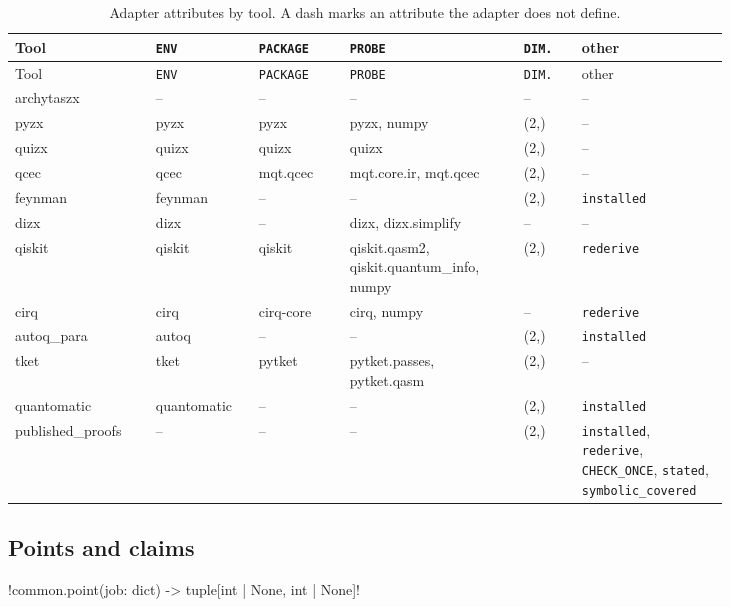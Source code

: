 \begin{longtable}{@{}>{\raggedright\arraybackslash}p{0.17\linewidth}>{\raggedright\arraybackslash}p{0.11\linewidth}>{\raggedright\arraybackslash}p{0.11\linewidth}>{\raggedright\arraybackslash}p{0.21\linewidth}>{\raggedright\arraybackslash}p{0.07\linewidth}>{\raggedright\arraybackslash}p{0.16\linewidth}@{}}
\caption{Adapter attributes by tool. A dash marks an attribute the adapter does not define.}\label{tab:bench-tools-attrs}\\
\toprule
Tool & \texttt{ENV} & \texttt{PACKAGE} & \texttt{PROBE} & \texttt{DIM.} & other \\
\midrule
\endfirsthead
\toprule
Tool & \texttt{ENV} & \texttt{PACKAGE} & \texttt{PROBE} & \texttt{DIM.} & other \\
\midrule
\endhead
\bottomrule
\endfoot
archytaszx & -- & -- & -- & -- & -- \\
pyzx & pyzx & pyzx & pyzx, numpy & (2,) & -- \\
quizx & quizx & quizx & quizx & (2,) & -- \\
qcec & qcec & mqt.qcec & mqt.core.ir, mqt.qcec & (2,) & -- \\
feynman & feynman & -- & -- & (2,) & \texttt{installed} \\
dizx & dizx & -- & dizx, dizx.simplify & -- & -- \\
qiskit & qiskit & qiskit & qiskit.qasm2, qiskit.quantum\_info, numpy & (2,) & \texttt{rederive} \\
cirq & cirq & cirq-core & cirq, numpy & -- & \texttt{rederive} \\
autoq\_para & autoq & -- & -- & (2,) & \texttt{installed} \\
tket & tket & pytket & pytket.passes, pytket.qasm & (2,) & -- \\
quantomatic & quan\-to\-matic & -- & -- & (2,) & \texttt{installed} \\
published\_\allowbreak proofs & -- & -- & -- & (2,) & \texttt{installed}, \texttt{rederive}, \texttt{CHECK\_\allowbreak ONCE}, \texttt{stated}, \texttt{symbolic\_\allowbreak covered} \\
\end{longtable}

\subsection{Points and claims}\label{sec:bench-tools-claims}

\begin{signature}
\py!common.point(job: dict) -> tuple[int | None, int | None]!
\end{signature}

